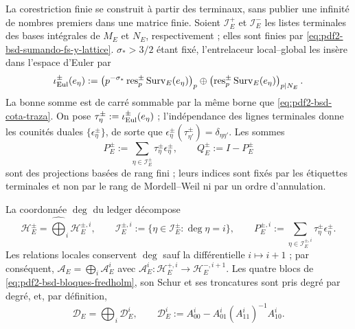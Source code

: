 La corestriction finie se construit à partir des terminaux, sans publier
une infinité de nombres premiers dans une matrice finie. Soient $\mathcal I_E^+$ et
$\mathcal I_E^-$ les listes terminales des bases intégrales de $M_E$ et
$N_E$, respectivement ; elles sont finies par
\eqref{eq:pdf2-bsd-sumando-fs-y-lattice}. $\sigma_*>3/2$ étant fixé,
l'entrelaceur local--global les insère dans l'espace d'Euler par
\begin{equation}\label{eq:pdf2-bsd-embedding-terminal-euler}
 \iota_{\rm Eul}^\pm(e_\eta):=
 \left(p^{-\sigma_*}\operatorname{res}_p^\pm
       \operatorname{Surv}_E(e_\eta)\right)_p
 \oplus\left(\operatorname{res}_p^\pm
       \operatorname{Surv}_E(e_\eta)\right)_{p\mid N_E}.
\end{equation}
La bonne somme est de carré sommable par la même borne que
\eqref{eq:pdf2-bsd-cota-traza}. On pose
$\tau_\eta^\pm:=\iota_{\rm Eul}^\pm(e_\eta)$ ; l'indépendance des lignes
terminales donne les counités duales $\{\epsilon_{\eta}^{\pm}\}$, de sorte que
$\epsilon_\eta^\pm(\tau_{\eta'}^\pm)=\delta_{\eta\eta'}$. Les sommes
\begin{equation}\label{eq:pdf2-bsd-proyecciones-terminales-finitas}
 P_E^\pm:=\sum_{\eta\in\mathcal I_E^\pm}
      \tau_\eta^\pm\epsilon_\eta^\pm,
 \qquad Q_E^\pm:=I-P_E^\pm
\end{equation}
sont des projections basées de rang fini ; leurs indices sont fixés par les
étiquettes terminales et non par le rang de Mordell--Weil ni par un ordre
d'annulation.

La coordonnée $\deg$ du ledger décompose
\begin{equation}\label{eq:pdf2-bsd-graduacion-fredholm}
 \mathscr H_E^\pm=\widehat\bigoplus_i\mathscr H_E^{\pm,i},
 \qquad
 \mathcal I_E^{\pm,i}:=\{\eta\in\mathcal I_E^\pm:\deg\eta=i\},
 \qquad
 P_E^{\pm,i}:=
 \sum_{\eta\in\mathcal I_E^{\pm,i}}\tau_\eta^\pm\epsilon_\eta^\pm.
\end{equation}
Les relations locales conservent $\deg$ sauf la différentielle $i\mapsto i+1$ ;
par conséquent,
$\mathscr A_E=\bigoplus_i\mathscr A_E^i$ avec
$\mathscr A_E^i:\mathscr H_E^{+,i}\to\mathscr H_E^{-,i+1}$. Les quatre
blocs de \eqref{eq:pdf2-bsd-bloques-fredholm}, son Schur et ses troncatures
sont pris degré par degré, et, par définition,
\begin{equation}\label{eq:pdf2-bsd-schur-graduado}
 \mathscr D_E=\bigoplus_i\mathscr D_E^i,
 \qquad
 \mathscr D_E^i:=A_{00}^i-A_{01}^i(A_{11}^i)^{-1}A_{10}^i.
\end{equation}

